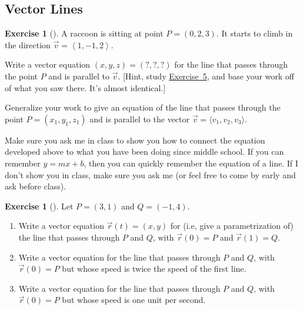 \documentclass[10pt,]{book}
\theoremstyle{plain}
\theoremstyle{definition}
\theoremstyle{definition}
\theoremstyle{definition}
\theoremstyle{definition}
\newtheorem{exploration}[project]{Exercise}
\theoremstyle{definition}
\numberwithin{equation}{section}
\newcommand{\lt}{<}
\begin{document}
\subsection[{Vector Lines}]{Vector Lines}\label{subsection-7}
\begin{exploration}[]\label{exploration-27}
A raccoon is sitting at point \(P=(0,2,3)\). It starts to climb in the direction \(\vec v=\left\lt 1,-1,2\right>\).%
\par
Write a vector equation \((x,y,z)=(?,?,?)\) for the line that passes through the point \(P\) and is parallel to \(\vec v\). [Hint, study \hyperref[prob_horseline]{Exercise~5}, and base your work off of what you saw there. It's almost identical.]%
\par
Generalize your work to give an equation of the line that passes through the point \(P=(x_1,y_1,z_1)\) and is parallel to the vector \(\vec v=\langle v_1,v_2,v_3 \rangle\).%
\end{exploration}
Make sure you ask me in class to show you how to connect the equation developed above to what you have been doing since middle school. If you can remember \(y=mx+b\), then you can quickly remember the equation of a line. If I don't show you in class, make sure you ask me (or feel free to come by early and ask before class).%
\begin{exploration}[]\label{first_line_between_two_points}
Let \(P=(3,1)\) and \(Q=(-1,4)\).%
\begin{enumerate}[font=\bfseries,label=(\alph*),ref=\alph*]
\item\label{task-57} Write a vector equation \(\vec r(t)=(x,y)\) for (i.e, give a parametrization of) the line that passes through \(P\) and \(Q\), with \(\vec r(0)=P\) and \(\vec r(1)=Q\).%
\item\label{task-58} Write a vector equation for the line that passes through \(P\) and \(Q\), with \(\vec r(0)=P\) but whose speed is twice the speed of the first line.%
\item\label{task-59} Write a vector equation for the line that passes through \(P\) and \(Q\), with \(\vec r(0)=P\) but whose speed is one unit per second.%
\end{enumerate}
\end{exploration}
\typeout{************************************************}
\typeout{************************************************}
\end{document}
